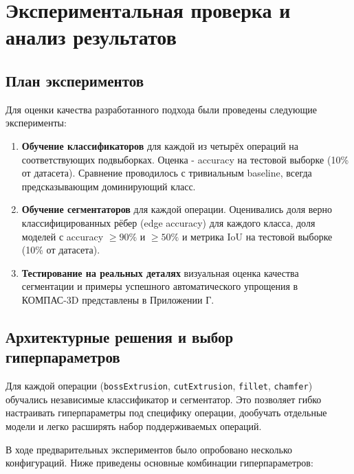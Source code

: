 
\section{Экспериментальная проверка и анализ результатов}

\subsection{План экспериментов}
Для оценки качества разработанного подхода были проведены следующие эксперименты:

\begin{enumerate}
    \item \textbf{Обучение классификаторов} для каждой из четырёх операций на соответствующих подвыборках. Оценка - accuracy на тестовой выборке (10\% от датасета). Сравнение проводилось с тривиальным baseline, всегда предсказывающим доминирующий класс.
    \item \textbf{Обучение сегментаторов} для каждой операции. Оценивались доля верно классифицированных рёбер (edge accuracy) для каждого класса, доля моделей с accuracy $\ge 90\%$ и $\ge 50\%$ и метрика IoU на тестовой выборке (10\% от датасета).
    \item \textbf{Тестирование на реальных деталях} визуальная оценка качества сегментации и примеры успешного автоматического упрощения в КОМПАС-3D представлены в Приложении Г.
\end{enumerate}

\subsection{Архитектурные решения и выбор гиперпараметров}
Для каждой операции (\texttt{bossExtrusion}, \texttt{cutExtrusion}, \texttt{fillet}, \texttt{chamfer}) обучались независимые классификатор и сегментатор. Это позволяет гибко настраивать гиперпараметры под специфику операции, дообучать отдельные модели и легко расширять набор поддерживаемых операций.

В ходе предварительных экспериментов было опробовано несколько конфигураций. Ниже приведены основные комбинации гиперпараметров:

